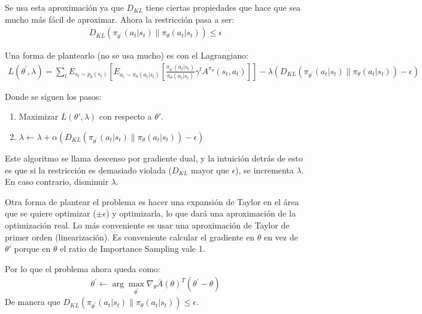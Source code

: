 Se usa esta aproximación ya que $D_{KL}$ tiene ciertas propiedades que hace que sea mucho más
fácil de aproximar. Ahora la restricción pasa a ser:
\begin{align}
D _ { KL } ( \pi _ { \theta ^ { \prime } } ( a _ { t } | s _ { t } ) \| \pi _ { \theta } ( a _ { t } | s _ { t } ) ) \leq \epsilon
\end{align}

Una forma de plantearlo (no se usa mucho) es con el Lagrangiano:
\begin{align}
L ( \theta ^ { \prime } , \lambda ) = \sum _ { t } E _ { s _ { t } \sim p _ { \theta } ( s _ { t } ) } \left[ E _ { a _ { t } \sim \pi _ { \theta } ( a _ { t } | s _ { t } ) } \left[ \frac { \pi _ { \theta ^ { \prime } } ( a _ { t } | s _ { t } ) } { \pi _ { \theta } ( a _ { t } | s _ { t } ) } \gamma ^ { t } A ^ { \pi _ { \theta } } ( s _ { t } , a _ { t } ) \right] \right] - \lambda ( D _ { KL } ( \pi _ { \theta ^ { \prime } } ( a _ { t } | s _ { t } ) \| \pi _ { \theta } ( a _ { t } | s _ { t } ) ) - \epsilon )
\end{align}

Donde se siguen los pasos:
\begin{enumerate}
    \item Maximizar $L(\theta',\lambda)$ con respecto a $\theta'$.
    \item $ \lambda \leftarrow \lambda + \alpha ( D _ { KL } ( \pi _ { \theta ^ { \prime } } ( a _ { t } | s _ { t } ) \| \pi _ { \theta } ( a _ { t } | s _ { t } ) ) - \epsilon ) $
\end{enumerate}

Este algoritmo se llama descenso por gradiente dual, y la intuición detrás de esto es que si la
restricción es demasiado violada ($D_{KL}$ mayor que $\epsilon$), se incrementa
$\lambda$. En caso contrario, disminuir $\lambda$.


Otra forma de plantear el problema es hacer una expansión de Taylor en el área que se quiere
optimizar ($\pm \epsilon$) y optimizarla, lo que dará una aproximación de la optimización real.
Lo más conveniente es usar una aproximación de Taylor de primer orden (linearización). Es
conveniente calcular el gradiente en $\theta$ en vez de $\theta'$ porque en $\theta$ el ratio de
Importance Sampling vale 1.

Por lo que el problema ahora queda como:
\begin{align}
\theta ^ { \prime } \leftarrow \operatorname { arg } \operatorname { max } _ { \theta ^ { \prime } } \nabla _ { \theta } \overline { A } ( \theta ) ^ { T } ( \theta ^ { \prime } - \theta )
\end{align}
De manera que $ D _ { KL } ( \pi _ { \theta ^ { \prime } } ( a _ { t } | s _ { t } ) \| \pi _ {
\theta } ( a _ { t } | s _ { t } ) ) \leq \epsilon $.

